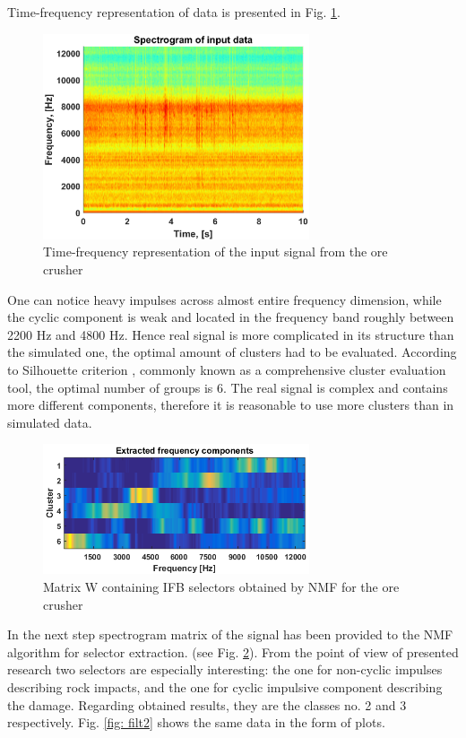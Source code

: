 \documentclass[preprint,12pt]{elsarticle}
\begin{document}
Time-frequency representation of data is presented in Fig. \ref{fig: spec2}.

\begin{figure}[!ht]
\centering
\includegraphics[width = 0.7\textwidth]{figs3/spec.eps}
\caption{Time-frequency representation of the input signal from the ore crusher}
\label{fig: spec2}
\end{figure}

One can notice heavy impulses across almost entire frequency dimension, while the cyclic component is weak and located in the frequency band roughly between 2200 Hz and 4800 Hz. Hence real signal is more complicated in its structure than the simulated one, the optimal amount of clusters had to be evaluated. According to Silhouette criterion \cite{kaufman2009finding,rousseeuw1987silhouettes}, commonly known as a comprehensive cluster evaluation tool, the optimal number of groups is 6. The real signal is complex and contains more different components, therefore it is reasonable to use more clusters than in simulated data.

\begin{figure}[!ht]
\centering
\includegraphics[width = 0.7\textwidth]{figs3/profiles1}
\caption{Matrix W containing IFB selectors obtained by NMF for the ore crusher}
\label{fig: mat2}
\end{figure}

In the next step spectrogram matrix of the signal has been provided to the NMF algorithm for selector extraction. (see Fig. \ref{fig: mat2}). From the point of view of presented research two selectors are especially interesting: the one for non-cyclic impulses describing rock impacts, and the one for cyclic impulsive component describing the damage. Regarding obtained results, they are the classes no. 2 and 3 respectively. Fig. \ref{fig: filt2} shows the same data in the form of plots. 
\end{document}
